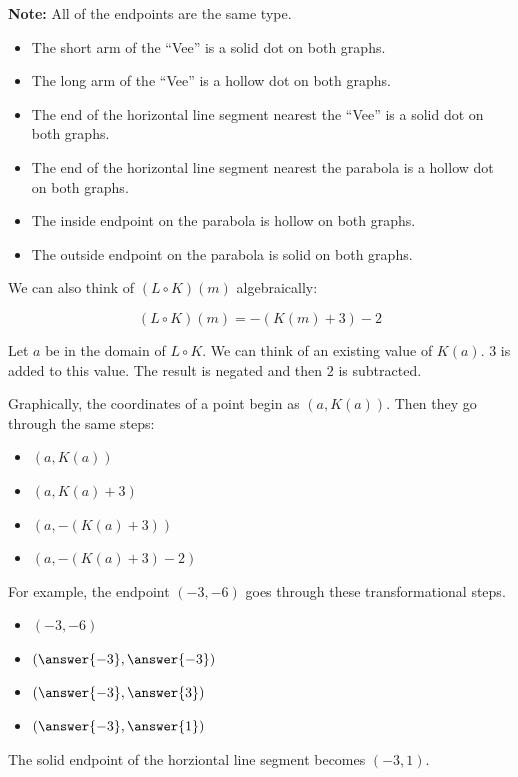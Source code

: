 \documentclass{ximera}
\begin{document}
\textbf{Note:} All of the endpoints are the same type.  

\begin{itemize}
\item The short arm of the ``Vee'' is a solid dot on both graphs.
\item The long arm of the ``Vee'' is a hollow dot on both graphs.
\item The end of the horizontal line segment nearest the ``Vee'' is a solid dot on both graphs.
\item The end of the horizontal line segment nearest the parabola is a hollow dot on both graphs.
\item The inside endpoint on the parabola is hollow on both graphs.
\item The outside endpoint on the parabola is solid on both graphs.
\end{itemize}



We can also think of $(L \circ K)(m)$ algebraically:


\[
(L \circ K)(m) = -(K(m)+3) - 2
\]


Let $a$ be in the domain of $L \circ K$. We can think of an existing value of $K(a)$.  $3$ is added to this value. The result is negated and then $2$ is subtracted. 

Graphically, the coordinates of a point begin as $(a, K(a))$.  Then they go through the same steps: 


\begin{itemize}
\item $(a, K(a))$
\item $(a, K(a) + 3)$
\item $(a, -(K(a) + 3))$
\item $(a, -(K(a) + 3) - 2)$
\end{itemize}



\begin{procedure}
For example, the endpoint $(-3, -6)$ goes through these transformational steps.

\begin{itemize}
\item $(-3, -6)$
\item $\left( \answer{-3},  \answer{-3} \right)$
\item $\left( \answer{-3},  \answer{3} \right)$
\item $\left( \answer{-3},  \answer{1} \right)$
\end{itemize}

The solid endpoint of the horziontal line segment becomes $(-3, 1)$.
\end{procedure}
\end{document}
